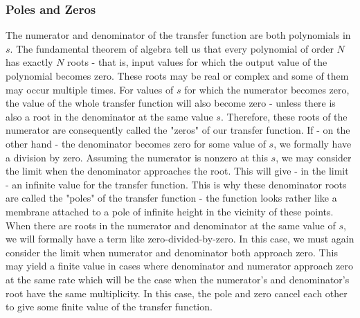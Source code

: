 \subsubsection{Poles and Zeros}
The numerator and denominator of the transfer function are both polynomials in $s$. The fundamental theorem of algebra tell us that every polynomial of order $N$ has exactly $N$ roots - that is, input values for which the output value of the polynomial becomes zero. These roots may be real or complex and some of them may occur multiple times. For values of $s$ for which the numerator becomes zero, the value of the whole transfer function will also become zero - unless there is also a root in the denominator at the same value $s$. Therefore, these roots of the numerator are consequently called the "zeros" of our transfer function. If - on the other hand - the denominator becomes zero for some value of $s$, we formally have a division by zero. Assuming the numerator is nonzero at this $s$, we may consider the limit when the denominator approaches the root. This will give - in the limit - an infinite value for the transfer function. This is why these denominator roots are called the "poles" of the transfer function - the function looks rather like a membrane attached to a pole of infinite height in the vicinity of these points. When there are roots in the numerator and denominator at the same value of $s$, we will formally have a term like zero-divided-by-zero. In this case, we must again consider the limit when numerator and denominator both approach zero. This may yield a finite value in cases where denominator and numerator approach zero at the same rate which will be the case when the numerator's and denominator's root have the same multiplicity. In this case, the pole and zero cancel each other to give some finite value of the transfer function.

